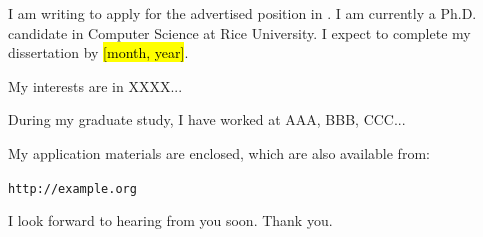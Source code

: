 \documentclass[12pt,stdletter,dateno,sigleft]{newlfm} %
\newcommand\note[1]{\sethlcolor{yellow} \hl{[#1]}}
\begin{document}
\begin{newlfm}



I am writing to apply for 
the advertised position \ifdefined\positionid\positionid{}\fi in \univer{}.  
I am currently a Ph.D. candidate in Computer Science at Rice University. 
I expect to complete my dissertation by \note{month, year}.

My interests are in XXXX...

During my graduate study, I have worked at AAA, BBB, CCC...

My application materials are enclosed, which are also available from: 
\begin{center}
\texttt{http://example.org}
\end{center}

I look forward to hearing from you soon. Thank you. 

\end{newlfm}
\end{document}
